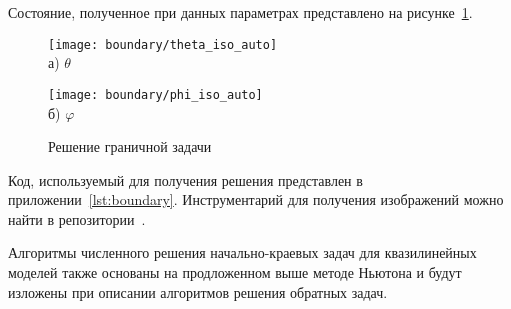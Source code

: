 Состояние, полученное при данных параметрах представлено на рисунке~\ref{fig:4_1:boundary}.
\begin{figure}[h!t]
    \begin{minipage}[b][][b]{0.49\linewidth}
        \centering
        \texttt{[image: boundary/theta\_iso\_auto]} \\ а) $\theta$
    \end{minipage}
    \hfill
    \begin{minipage}[b][][b]{0.49\linewidth}
        \centering
        \texttt{[image: boundary/phi\_iso\_auto]} \\ б) $\varphi$
    \end{minipage}
    \caption{Решение граничной задачи}
    \label{fig:4_1:boundary}
\end{figure}


Код, используемый для получения решения представлен в приложении~\ref{lst:boundary}.
Инструментарий для получения изображений можно найти в репозитории~\cite{mesenev-github}.
\begin{remark}
    Алгоритмы численного решения начально-краевых задач для квазилинейных моделей
    также основаны на продложенном выше методе Ньютона и будут изложены при описании
    алгоритмов решения обратных задач.
\end{remark}









